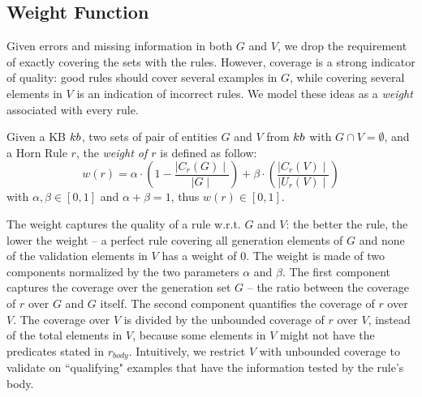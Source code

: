 \vspace{-1ex}	
\subsection{Weight Function} \label{sec:krd_weight_fun}
\vspace{-0.2ex}	
Given errors and missing information in both $G$ and $V$, we drop the requirement of exactly covering the sets with the rules. However, coverage is a strong indicator of quality: good rules should cover several examples in $G$, while covering several elements in $V$ is an indication of incorrect rules.
We model these ideas as a \emph{weight} associated with every rule. %


\begin{definition}
\label{def:cost}
	Given a KB ${\sc kb}$, two sets of pair of entities $G$ and $V$ from ${\sc kb}$ with $G \cap V = \emptyset$, and a Horn Rule $r$, the {\em weight of $r$} is defined as follow:
	\begin{equation} \label{eq:weight_fun}
		w(r) = \alpha \cdot (1-\frac{\mid C_{r}(G)\mid}{\mid G \mid}) +\beta \cdot (\frac{\mid C_{r}(V) \mid}{\mid U_{r}(V)\mid})
	\end{equation}
	with $\alpha,\beta \in [0,1]$ and $\alpha + \beta = 1$, thus $w(r) \in [0,1]$. 
\end{definition}

The weight 
captures the quality of a rule w.r.t. $G$ and $V$: the better the rule, the lower the weight -- a perfect rule covering all generation elements of $G$ and none of the validation elements in $V$ has a weight of $0$.
%
The weight is made of two components normalized by the two parameters $\alpha$ and $\beta$.
The first component captures the coverage over the generation set $G$ -- the ratio between the coverage of $r$ over $G$ and $G$ itself.
The second component quantifies the coverage of $r$ over $V$. The coverage over $V$ is divided by the unbounded coverage of $r$ over $V$, instead of the total elements in $V$, 
because some elements in $V$ might not have the predicates stated in $r_{body}$.
Intuitively, we restrict $V$ with unbounded coverage to validate on ``qualifying" examples that have the information tested by the rule's body.


